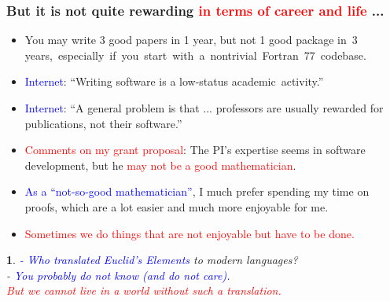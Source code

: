 \documentclass[slidestop,mathserif,xcolor=dvipsnames]{beamer}
\newcommand{\blue}[1]{\textcolor{blue}{#1}}
\newcommand{\red}[1]{\textcolor{red}{#1}}
\newtheorem*{mybox}{}
\begin{document}
\begin{frame}
    \frametitle{But it is not quite rewarding \red{in terms of career  and life} ...}

    \begin{itemize}
        \item You may write 3 good papers in 1 year, but not 1 good package in~3 years,~especially~if~you~start~with~a~nontrivial~Fortran~77~codebase.
            \vspace{1ex}
        \item \blue{Internet}: ``Writing software is a low-status academic~activity.''
            \vspace{1ex}
        \item \blue{Internet}: ``A general problem is that ... professors are usually rewarded for publications, not their software.''
           \vspace{1ex}
       \item \red{Comments on my grant proposal}: The PI's expertise seems in software development,
           but he \red{may not be a good mathematician}.
           \vspace{1ex}
       \item \blue{As a ``not-so-good mathematician''}, I much prefer spending my time on
           proofs, which are a lot easier and much more enjoyable for me.
    \vspace{1ex}
\item \red{Sometimes we do things that are not enjoyable but have to be done.}

    \end{itemize}
    \begin{mybox}
\blue{- Who translated Euclid's \textit{Elements}} to modern
    languages?\\
    - \blue{You probably do not know (and do not care).}\\
    \phantom{-} \red{But we cannot live in a world without such a translation.}
    \end{mybox}

\end{frame}
\end{document}
